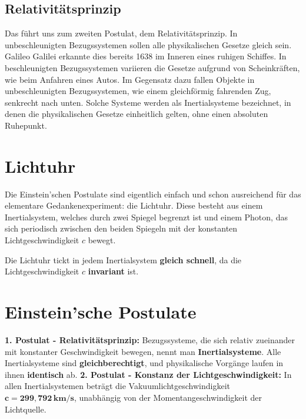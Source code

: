 \documentclass[a4paper]{report}
\begin{document}
\subsection{Relativitätsprinzip}
Das führt uns zum zweiten Postulat, dem Relativitätsprinzip. In unbeschleunigten Bezugssystemen sollen alle physikalischen Gesetze gleich sein. Galileo Galilei erkannte dies bereits 1638 im Inneren eines ruhigen Schiffes.
In beschleunigten Bezugssystemen variieren die Gesetze aufgrund von Scheinkräften, wie beim Anfahren eines Autos. Im Gegensatz dazu fallen Objekte in unbeschleunigten Bezugssystemen, wie einem gleichförmig fahrenden Zug, senkrecht nach unten. Solche Systeme werden als Inertialsysteme bezeichnet, in denen die physikalischen Gesetze einheitlich gelten, ohne einen absoluten Ruhepunkt.
\section{Lichtuhr}
Die Einstein'schen Postulate sind eigentlich einfach und schon ausreichend für das elementare Gedankenexperiment: die Lichtuhr.
Diese besteht aus einem Inertialsystem, welches durch zwei Spiegel begrenzt ist und einem Photon, das sich periodisch zwischen den beiden Spiegeln mit der konstanten Lichtgeschwindigkeit \(c\) bewegt.
\begin{flushleft}
\begin{tcolorbox}
	Die Lichtuhr tickt in jedem Inertialsystem \textbf{gleich schnell}, da die Lichtgeschwindigkeit \(c\) \textbf{invariant} ist.
\end{tcolorbox}
\end{flushleft}
\section{Einstein'sche Postulate}
\begin{flushleft}
	\begin{tcolorbox}
		\textbf{1. Postulat - Relativitätsprinzip:}
		\newline
		Bezugssysteme, die sich relativ zueinander mit konstanter Geschwindigkeit bewegen, nennt man \textbf{Inertialsysteme}. Alle Inertialsysteme sind \textbf{gleichberechtigt}, und physikalische Vorgänge laufen in ihnen \textbf{identisch} ab.
		\newline
		\newline
		\textbf{2. Postulat - Konstanz der Lichtgeschwindigkeit:}
		\newline
		In allen Inertialsystemen beträgt die Vakuumlichtgeschwindigkeit \(\mathbf{c = 299,792 \, \text{km/s}}\), unabhängig von der Momentangeschwindigkeit der Lichtquelle.
	\end{tcolorbox}
\end{flushleft}
\end{document}

